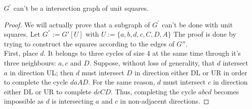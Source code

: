 \documentclass[12pt]{article}
\begin{document}
\begin{theorem}
    $G^'$ can't be a intersection graph of unit squares.
\end{theorem}

\begin{proof}
    We will actually prove that a subgraph of $G^'$ can't be done with unit squares. Let $G^{''}:=G'[U]$ with $U := \{a, b, d, c, C, D, A\}$
    The proof is done by trying to construct the squares according to the edges of $G''$.\\
    First, place $d$. It belongs to three cycles of size 4 at the same time through it's three neighbours: $a, c$ and $D$. Suppose, without loss of generality,
    that $d$ intersect $a$ in direction UL; then $d$ must intersect $D$ in direction either DL or UR in order to complete the cycle $daAD$. For the same reason,
    $d$ must intersect $c$ in direction either DL or UR to complete $dcCD$. Thus, completing the cycle $abcd$ becomes impossible as $d$ is intersecting $a$ and $c$
    in non-adjacent directions. 
\end{proof}
\end{document}
